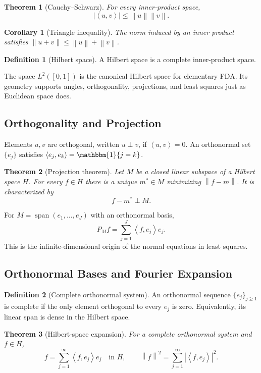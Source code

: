 \documentclass[12pt,oneside]{book}
\numberwithin{equation}{section}
\theoremstyle{definition}
\newtheorem{definition}{Definition}[section]
\theoremstyle{plain}
\newtheorem{theorem}{Theorem}[section]
\newtheorem{corollary}{Corollary}[section]
\theoremstyle{remark}
\newcommand{\ind}{\mathbbm{1}}
\newcommand{\norm}[1]{\left\lVert #1 \right\rVert}
\newcommand{\abs}[1]{\left\lvert #1 \right\rvert}
\newcommand{\inner}[2]{\left\langle #1, #2 \right\rangle}
\begin{document}
\begin{theorem}[Cauchy--Schwarz]
For every inner-product space,
\[
    \abs{\inner u v}\leq\norm u\norm v.
\]
\end{theorem}

\begin{corollary}[Triangle inequality]
The norm induced by an inner product satisfies
$\norm{u+v}\leq\norm u+\norm v$.
\end{corollary}

\begin{definition}[Hilbert space]
A Hilbert space is a complete inner-product space.
\end{definition}

The space $L^2([0,1])$ is the canonical Hilbert space for elementary FDA. Its
geometry supports angles, orthogonality, projections, and least squares just
as Euclidean space does.

\subsection{Orthogonality and Projection}

Elements $u,v$ are orthogonal, written $u\perp v$, if $\inner u v=0$. An
orthonormal set $\{e_j\}$ satisfies
$\inner{e_j}{e_k}=\ind\{j=k\}$.

\begin{theorem}[Projection theorem]
Let $M$ be a closed linear subspace of a Hilbert space $H$. For every $f\in H$
there is a unique $m^*\in M$ minimizing $\norm{f-m}$. It is characterized by
\[
    f-m^*\perp M.
\]
\end{theorem}

For $M=\operatorname{span}(e_1,\ldots,e_J)$ with an orthonormal basis,
\[
    P_Mf=\sum_{j=1}^J\inner f{e_j}e_j.
\]
This is the infinite-dimensional origin of the normal equations in least
squares.

\subsection{Orthonormal Bases and Fourier Expansion}

\begin{definition}[Complete orthonormal system]
An orthonormal sequence $\{e_j\}_{j\geq1}$ is complete if the only element
orthogonal to every $e_j$ is zero. Equivalently, its linear span is dense in
the Hilbert space.
\end{definition}

\begin{theorem}[Hilbert-space expansion]
For a complete orthonormal system and $f\in H$,
\[
 f=\sum_{j=1}^\infty\inner f{e_j}e_j
 \quad\text{in }H,\qquad
 \norm f^2=\sum_{j=1}^\infty\abs{\inner f{e_j}}^2.
\]
\end{theorem}
\end{document}
